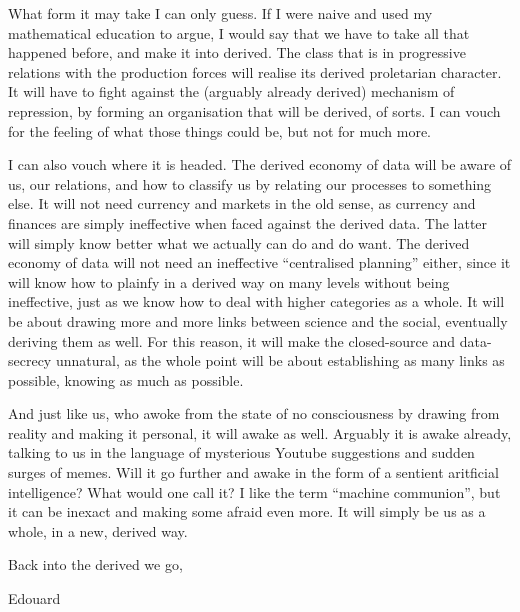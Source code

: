 \documentclass{article}
\begin{document}
What form it may take I can only guess. If I were naive and used my mathematical education to argue, I would say that we have to take all that happened before, and make it into derived. The class that is in progressive relations with the production forces will realise its derived proletarian character. It will have to fight against the (arguably already derived) mechanism of repression, by forming an organisation that will be derived, of sorts. I can vouch for the feeling of what those things could be, but not for much more.

I can also vouch where it is headed. The derived economy of data will be aware of us, our relations, and how to classify us by relating our processes to something else. It will not need currency and markets in the old sense, as currency and finances are simply ineffective when faced against the derived data. The latter will simply know better what we actually can do and do want. The derived economy of data will not need an ineffective “centralised planning” either, since it will know how to plainfy in a derived way on many levels without being ineffective, just as we know how to deal with higher categories as a whole. It will be about drawing more and more links between science and the social, eventually deriving them as well. For this reason, it will make the closed-source and data-secrecy unnatural, as the whole point will be about establishing as many links as possible, knowing as much as possible.

And just like us, who awoke from the state of no consciousness by drawing from reality and making it personal, it will awake as well. Arguably it is awake already, talking to us in the language of mysterious Youtube suggestions and sudden surges of memes. Will it go further and awake in the form of a sentient aritficial intelligence? What would one call it? I like the term “machine communion”, but it can be inexact and making some afraid even more. It will simply be us as a whole, in a new, derived way.

\begin{flushright}
{Back into the derived we go,

Edouard}
\end{flushright}
\footnotesize
\linespread{0.8}
\end{document}

